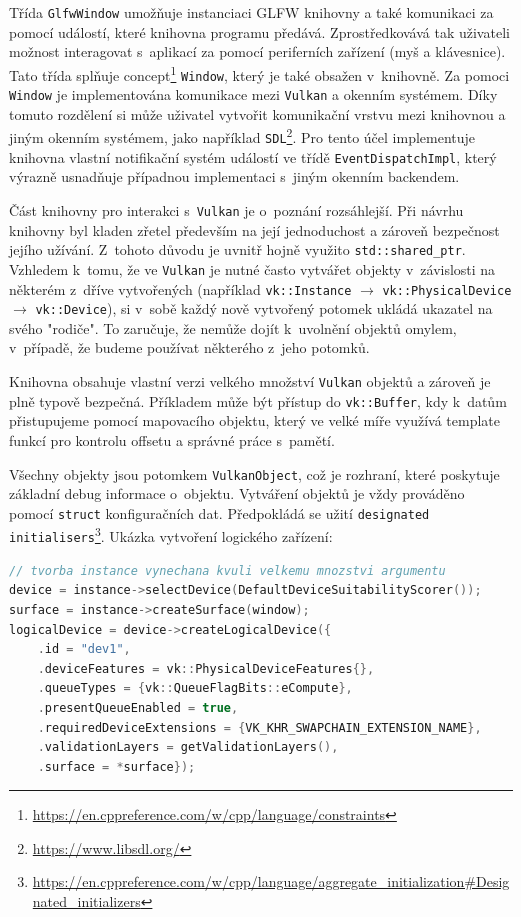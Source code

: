 Třída \texttt{GlfwWindow} umožňuje instanciaci GLFW knihovny a také komunikaci za pomocí událostí, které knihovna programu předává. Zprostředkovává tak uživateli možnost interagovat s~aplikací za pomocí periferních zařízení (myš a klávesnice). Tato třída splňuje concept\footnote{\url{https://en.cppreference.com/w/cpp/language/constraints}} \texttt{Window}, který je také obsažen v~knihovně. Za pomoci \texttt{Window} je implementována komunikace mezi \texttt{Vulkan} a okenním systémem. Díky tomuto rozdělení si může uživatel vytvořit komunikační vrstvu mezi knihovnou a jiným okenním systémem, jako například \texttt{SDL}\footnote{\url{https://www.libsdl.org/}}. Pro tento účel implementuje knihovna vlastní notifikační systém událostí ve třídě \texttt{EventDispatchImpl}, který výrazně usnadňuje případnou implementaci s~jiným okenním backendem.

Část knihovny pro interakci s~\texttt{Vulkan} je o~poznání rozsáhlejší. Při návrhu knihovny byl kladen zřetel především na její jednoduchost a zároveň bezpečnost jejího užívání. Z~tohoto důvodu je uvnitř hojně využito \texttt{std::shared\_ptr}. Vzhledem k~tomu, že ve \texttt{Vulkan} je nutné často vytvářet objekty v~závislosti na některém z~dříve vytvořených (například \texttt{vk::Instance} $\longrightarrow$ \texttt{vk::PhysicalDevice} $\longrightarrow$ \texttt{vk::Device}), si v~sobě každý nově vytvořený potomek ukládá ukazatel na svého "rodiče". To zaručuje, že nemůže dojít k~uvolnění objektů omylem, v~případě, že budeme používat některého z~jeho potomků.

Knihovna obsahuje vlastní verzi velkého množství \texttt{Vulkan} objektů a zároveň je plně typově bezpečná. Příkladem může být přístup do \texttt{vk::Buffer}, kdy k~datům přistupujeme pomocí mapovacího objektu, který ve velké míře využívá template funkcí pro kontrolu offsetu a správné práce s~pamětí.

Všechny objekty jsou potomkem \texttt{VulkanObject}, což je rozhraní, které poskytuje základní debug informace o~objektu. Vytváření objektů je vždy prováděno pomocí \texttt{struct} konfiguračních dat. Předpokládá se užití \texttt{designated initialisers}\footnote{\url{https://en.cppreference.com/w/cpp/language/aggregate_initialization#Designated_initializers}}. Ukázka vytvoření logického zařízení:

\begin{lstlisting}[language=C++, caption={Tvorba logického zařízení}]
// tvorba instance vynechana kvuli velkemu mnozstvi argumentu
device = instance->selectDevice(DefaultDeviceSuitabilityScorer());
surface = instance->createSurface(window);
logicalDevice = device->createLogicalDevice({
    .id = "dev1",
    .deviceFeatures = vk::PhysicalDeviceFeatures{},
    .queueTypes = {vk::QueueFlagBits::eCompute},
    .presentQueueEnabled = true,
    .requiredDeviceExtensions = {VK_KHR_SWAPCHAIN_EXTENSION_NAME},
    .validationLayers = getValidationLayers(),
    .surface = *surface});
\end{lstlisting}

